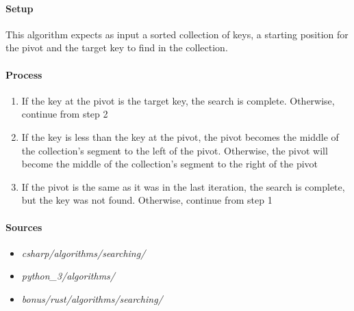 \documentclass{article}
\begin{document}
\paragraph{Setup}
This algorithm expects as input a sorted collection of keys, a starting position for the pivot and the target key to find in
the collection.

\paragraph{Process}
\begin{enumerate}
\item{If the key at the pivot is the target key, the search is complete. Otherwise, continue from step 2}
\item{If the key is less than the key at the pivot, the pivot becomes the middle of the collection's segment to the left of the pivot. Otherwise, the pivot will become the middle of the collection's segment to the right of the pivot}
\item{If the pivot is the same as it was in the last iteration, the search is complete, but the key was not found. Otherwise, continue from step 1}
\end{enumerate}



\begin{samepage}
  \paragraph{Sources}
  \begin{itemize}
  \item{{\em csharp/algorithms/searching/}}
  \item{{\em python\_3/algorithms/}}
  \item{{\em bonus/rust/algorithms/searching/}}
  \end{itemize}
\end{samepage}


\newpage
\end{document}
